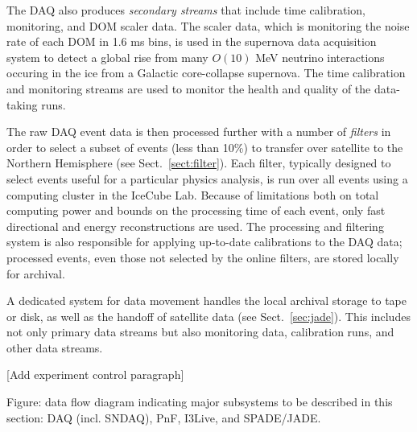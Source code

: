The DAQ also produces \emph{secondary streams} that include time
calibration, monitoring, and DOM scaler data.  The scaler data, which is
monitoring the noise rate of each DOM in 1.6 ms bins, is used in the
supernova data acquisition system \cite{sndaq} to detect a global rise from
many $O(10)$ MeV neutrino interactions occuring in the ice from a
Galactic core-collapse supernova.  The time calibration and monitoring
streams are used to monitor the health and quality of the data-taking runs.

The raw DAQ event data is then processed further with a number of
\emph{filters} in order to select a subset of events (less than 10\%) to
transfer over satellite to the Northern Hemisphere (see
Sect.~\ref{sect:filter}).  Each
filter, typically designed to select events useful for a particular physics
analysis, is run
over all events using a computing cluster in the IceCube Lab.  Because of
limitations both on total computing power and bounds on the processing time
of each event, only fast directional and energy reconstructions are used.
The processing and filtering system is also responsible for applying
up-to-date calibrations to the DAQ data; processed events, even those not
selected by the online filters, are stored locally for archival.

A dedicated system for data movement handles the local archival storage to
tape or disk, as well as the handoff of satellite data (see Sect.~\ref{sec:jade}).
This includes not only primary data streams but also monitoring data,
calibration runs, and other data streams.

[Add experiment control paragraph]



Figure: data flow diagram indicating major subsystems to be described in
this section: DAQ (incl. SNDAQ), PnF, I3Live, and SPADE/JADE.

